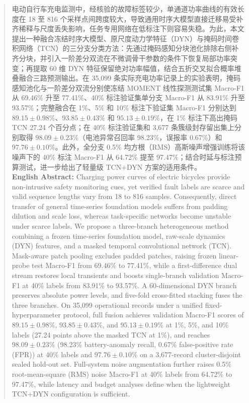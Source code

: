 \documentclass[12pt]{iopjournal}
\begin{document}
\begin{abstract}
电动自行车充电监测中，经核验的故障标签较少，单通道功率曲线的有效长度在 18 至 816 个采样点间跨度较大，导致通用时序大模型直接迁移易受补齐稀释与尺度丢失影响，任务专用网络在低标注下则容易失稳。为此，本文提出一种融合冻结时序大模型、原尺度动力学特征（DYN）与掩码时间卷积网络（TCN）的三分支分类方法：先通过掩码感知分块池化排除右侧补齐分块，并引入一阶差分双流在不微调骨干参数的条件下恢复局部功率突变；再提取 60 维 DYN 特征保留绝对功率幅值，结合五折交叉拟合概率堆叠融合三路预测输出。在 35,099 条实际充电功率记录上的实验表明，掩码感知池化与一阶差分双流分别使冻结 MOMENT 线性探测测试集 Macro-F1 从 69.46\% 升至 77.41\%、40\% 标注验证集单分支 Macro-F1 从 83.91\% 升至 93.57\%；完整融合在 1\%、5\% 和 10\% 标注下验证集 Macro-F1 分别达到 $89.15\pm0.98\%$、$93.85\pm0.43\%$ 和 $95.13\pm0.19\%$，在 1\% 标注下高出掩码 TCN 27.24 个百分点；在 40\% 标注验证集和 3,677 条簇级封存留出集上分别取得 $98.09\pm0.23\%$（电池异常召回率 98.23\%，误报率 0.67\%）和 $97.76\pm0.10\%$。此外，全分支 0.5\% 均方根（RMS）高斯噪声增强训练将该噪声下的 40\% 标注 Macro-F1 从 64.72\% 提至 97.47\%；结合时延与标注预算测试，进一步给出了轻量级 TCN+DYN 方案的适用条件。\\[6pt]
\noindent\textbf{English Abstract:} Charging power curves of electric bicycles provide non-intrusive safety monitoring cues, yet verified fault labels are scarce and valid sequence lengths vary from 18 to 816 samples. Consequently, direct transfer of general time-series foundation models suffers from padding dilution and scale loss, whereas task-specific networks become unstable under scarce labels. We propose a three-branch heterogeneous method combining a frozen time-series foundation model, raw-scale dynamics (DYN) features, and a masked temporal convolutional network (TCN). Mask-aware patch pooling excludes padded patches, raising frozen linear-probe test Macro-F1 from 69.46\% to 77.41\%, while a first-difference dual stream restores local transients and boosts single-branch validation Macro-F1 at 40\% labels from 83.91\% to 93.57\%. A 60-dimensional DYN branch preserves absolute power levels, and five-fold cross-fitted stacking fuses the three branches. On 35,099 operational records under a unified fixed-hyperparameter protocol, full fusion achieves validation Macro-F1 scores of $89.15\pm0.98\%$, $93.85\pm0.43\%$, and $95.13\pm0.19\%$ at 1\%, 5\%, and 10\% labels (27.24 points above the masked TCN at 1\%), and reaches $98.09\pm0.23\%$ (98.23\% battery-anomaly recall, 0.67\% false-positive rate (FPR)) at 40\% labels and $97.76\pm0.10\%$ on a 3,677-record cluster-disjoint sealed hold-out set. Full-system noise augmentation further raises 0.5\% root-mean-square (RMS) noise Macro-F1 at 40\% labels from 64.72\% to 97.47\%, while latency and budget analyses define when the lightweight TCN+DYN configuration is sufficient.
\end{abstract}
\end{document}
